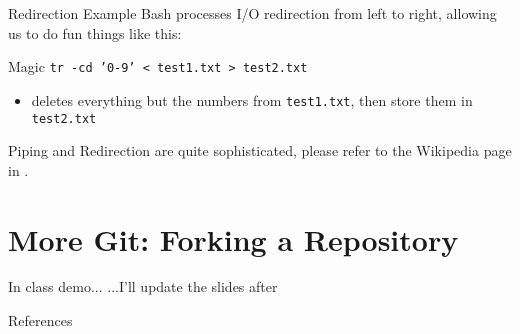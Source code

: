 \documentclass[11pt]{beamer}
\begin{document}
\begin{frame}[fragile]{Redirection Example}
  Bash processes I/O redirection from left to right, allowing us to do fun things like this:

  \begin{block}{Magic}
    \texttt{tr -cd '0-9' < test1.txt > test2.txt}
    \begin{itemize}
      \item deletes everything but the numbers from \texttt{test1.txt}, then store them in \texttt{test2.txt}
    \end{itemize}
  \end{block}

  Piping and Redirection are quite sophisticated, please refer to the Wikipedia page in \cite{wiki}.
\end{frame}
%

%
\section{More Git: Forking a Repository}
\label{sec:more_git_forking_a_repository}

\begin{frame}[fragile]{In class demo...}
  ...I'll update the slides after
\end{frame}

%

\begin{frame}[allowframebreaks]{References}
  
  
\end{frame}
\end{document}
